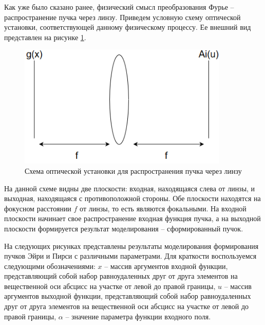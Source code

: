 {    Как уже было сказано ранее, физический смысл преобразования Фурье -- распространение пучка через линзу.
    Приведем условную схему оптической установки, соответствующей данному физическому процессу.
    Ее внешний вид представлен на рисунке \ref{four_sys}.
    \begin{figure}[H]
        \begin{center}
            \includegraphics[width=10cm]{plots/four_sys}
            \caption{Схема оптической установки для распространения пучка через линзу}
            \label{four_sys}
        \end{center}
    \end{figure}

    На данной схеме видны две плоскости: входная, находящаяся слева от линзы, и выходная,
    находящаяся с противоположной стороны. Обе плоскости находятся на фокусном расстоянии $f$ от линзы,
    то есть являются фокальными. На входной плоскости начинает свое распространение входная функция пучка,
    а на выходной плоскости формируется результат моделирования -- сформированный пучок.

    На следующих рисунках представлены результаты моделирования
    формирования пучков Эйри и Пирси с различными параметрами. Для
    краткости воспользуемся следующими обозначениями: $x$ – массив аргументов
    входной функции, представляющий собой набор равноудаленных друг от друга
    элементов на вещественной оси абсцисс на участке от левой до правой
    границы, $u$ – массив аргументов выходной функции, представляющий собой
    набор равноудаленных друг от друга элементов на вещественной оси абсцисс
    на участке от левой до правой границы, $\alpha$ – значение параметра функции
    входного поля.

}
